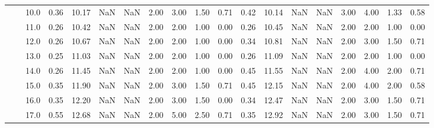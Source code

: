 \begin{tabular}{lllrrrrrrrrrrrrrrrr}
       &     & 10.0 &      0.36 &      10.17 &               NaN &                NaN & 2.00 &   3.00 &             1.50 &                         0.71 &      0.42 &      10.14 &               NaN &                NaN & 3.00 &   4.00 &             1.33 &                         0.58 \\
       &     & 11.0 &      0.26 &      10.42 &               NaN &                NaN & 2.00 &   2.00 &             1.00 &                         0.00 &      0.26 &      10.45 &               NaN &                NaN & 2.00 &   2.00 &             1.00 &                         0.00 \\
       &     & 12.0 &      0.26 &      10.67 &               NaN &                NaN & 2.00 &   2.00 &             1.00 &                         0.00 &      0.34 &      10.81 &               NaN &                NaN & 2.00 &   3.00 &             1.50 &                         0.71 \\
       &     & 13.0 &      0.25 &      11.03 &               NaN &                NaN & 2.00 &   2.00 &             1.00 &                         0.00 &      0.26 &      11.09 &               NaN &                NaN & 2.00 &   2.00 &             1.00 &                         0.00 \\
       &     & 14.0 &      0.26 &      11.45 &               NaN &                NaN & 2.00 &   2.00 &             1.00 &                         0.00 &      0.45 &      11.55 &               NaN &                NaN & 2.00 &   4.00 &             2.00 &                         0.71 \\
       &     & 15.0 &      0.35 &      11.90 &               NaN &                NaN & 2.00 &   3.00 &             1.50 &                         0.71 &      0.45 &      12.15 &               NaN &                NaN & 2.00 &   4.00 &             2.00 &                         0.58 \\
       &     & 16.0 &      0.35 &      12.20 &               NaN &                NaN & 2.00 &   3.00 &             1.50 &                         0.00 &      0.34 &      12.47 &               NaN &                NaN & 2.00 &   3.00 &             1.50 &                         0.71 \\
       &     & 17.0 &      0.55 &      12.68 &               NaN &                NaN & 2.00 &   5.00 &             2.50 &                         0.71 &      0.35 &      12.92 &               NaN &                NaN & 2.00 &   3.00 &             1.50 &                         0.71 \\

\end{tabular}
